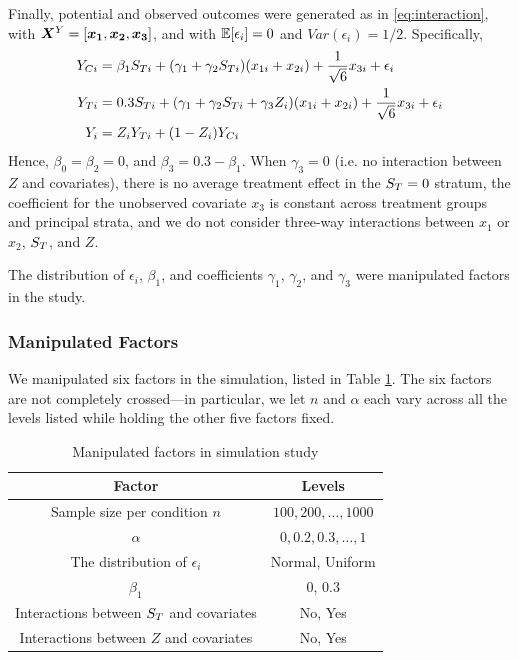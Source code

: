 \documentclass{statsoc} %
\begin{document}
Finally, potential and observed outcomes were generated as in \eqref{eq:interaction}, with $\bm{X}^Y=[\bm{x_1},\bm{x_2},\bm{x_3}]$,
and with $\mathbb{E}[\epsilon_i]=0$ and $Var(\epsilon_i)=1/2$.
Specifically,
\begin{equation}\label{eq:y-sim}
  \begin{split}
  Y_{Ci}&=\beta_1S_{Ti}+(\gamma_1+\gamma_2S_{Ti})(x_{1i}+x_{2i})+\frac{1}{\sqrt{6}}x_{3i}+\epsilon_i\\
  Y_{Ti}&=0.3S_{Ti}+(\gamma_1+\gamma_2S_{Ti}+\gamma_3Z_i)(x_{1i}+x_{2i})+\frac{1}{\sqrt{6}}x_{3i}+\epsilon_i\\
  Y_i&=Z_iY_{Ti}+(1-Z_i)Y_{Ci}
  \end{split}
\end{equation}
Hence, $\beta_0=\beta_2=0$, and $\beta_3=0.3-\beta_1$. When $\gamma_3=0$ (i.e. no interaction between $Z$ and covariates), there is no average treatment effect in the $S_T=0$ stratum, the coefficient for the unobserved covariate $x_3$ is constant across treatment groups and principal strata, and we do not consider three-way interactions between $x_1$ or $x_2$, $S_T$, and $Z$.

The distribution of $\epsilon_i$, $\beta_1$, and coefficients $\gamma_1$, $\gamma_2$, and $\gamma_3$ were manipulated factors in the study.


\subsubsection{Manipulated Factors}
We manipulated six factors in the simulation, listed in Table \ref{tab:factor}.
The six factors are not completely crossed---in particular, we let $n$ and $\alpha$ each vary across all the levels listed while holding the other five factors fixed.

\begin{table}
    \caption{\label{tab:factor} Manipulated factors in simulation study}
  \centering
\begin{tabular}{*{2}{c}}
  \hline
  Factor &Levels\\
  \hline
Sample size per condition $n$ &$100,200,\dots,1000$\\
$\alpha$ &$0,0.2,0.3,\dots,1$\\
The distribution of $\epsilon_i$& Normal, Uniform\\
$\beta_1$ & 0, 0.3\\
Interactions between $S_T$ and covariates & No, Yes\\
Interactions between $Z$ and covariates& No, Yes\\
\hline
  \end{tabular}
  \end{table}
\end{document}
